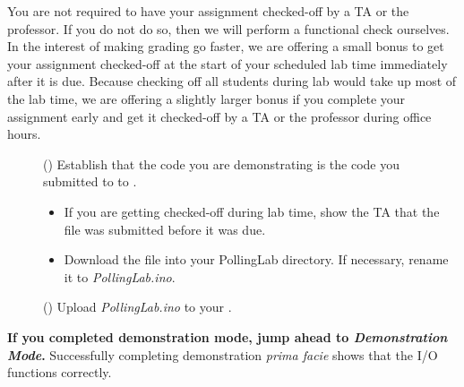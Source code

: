 You are not required to have your assignment checked-off by a TA or the
professor. If you do not do so, then we will perform a functional check
ourselves. In the interest of making grading go faster, we are offering a small
bonus to get your assignment checked-off at the start of your scheduled lab
time immediately after it is due. Because checking off all students during lab
would take up most of the lab time, we are offering a slightly larger bonus if
you complete your assignment early and get it checked-off by a TA or the
professor during office hours.

\begin{description}
\item [] (\phantom{xxx}) Establish that the code you are demonstrating is the code
    you submitted to to \filesubmission.
    \begin{itemize}
    \item If you are getting checked-off during lab time, show the TA that the
        file was submitted before it was due.
    \item Download the file into your PollingLab directory. If necessary,
        rename it to \textit{PollingLab.ino}.
    \end{itemize}
\item [] (\phantom{xxx}) Upload \textit{PollingLab.ino} to your \nano.
\end{description}
\textbf{If you completed demonstration mode, jump ahead to
\textit{Demonstration Mode}.} Successfully completing demonstration
\textit{prima facie} shows that the I/O functions correctly.

